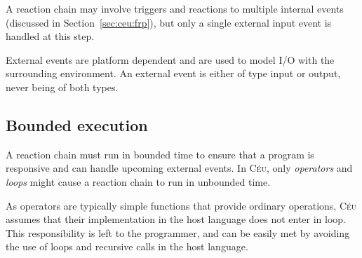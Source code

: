 \documentclass{sig-alternate-ipsn09}
\newcommand{\2}{\;\;}
\newcommand{\5}{\;\;\;\;\;}
\newcommand{\til}{$\thicksim$}
\newcommand{\CEU}{\textsc{C\'{e}u}}
\begin{document}
A reaction chain may involve triggers and reactions to multiple internal events 
(discussed in Section~\ref{sec:ceu:frp}), but only a single external input 
event is handled at this step.

External events are platform dependent and are used to model I/O with the 
surrounding environment.
An external event is either of type input or output, never being of both types.

\subsection{Bounded execution}
\label{sec:ceu:bounded}

A reaction chain must run in bounded time to ensure that a program is 
responsive and can handle upcoming external events.
In \CEU, only \emph{operators} and \emph{loops} might cause a reaction chain to 
run in unbounded time.

As operators are typically simple functions that provide ordinary operations, 
\CEU{} assumes that their implementation in the host language does not enter in 
loop.
This responsibility is left to the programmer, and can be easily met by 
avoiding the use of loops and recursive calls in the host language.
\end{document}
